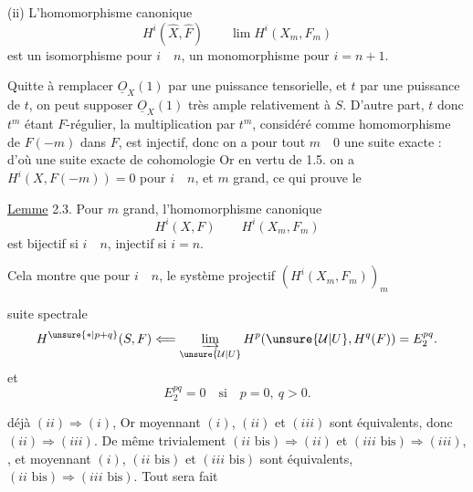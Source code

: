 (ii) L'homomorphisme canonique
\[
H^i(\widehat X,\widehat F)\qquad \lim H^i(X_m,F_m)
\]
est un isomorphisme pour $i\quad n$, un monomorphisme pour $i=n+1$.

 Quitte à remplacer $\underline O_X(1)$ par une puissance tensorielle, et $t$ par une puissance de $t$, on peut supposer $\underline O_X(1)$ très ample relativement à $S$. D'autre part, $t$ donc $t^m$ étant $F$-régulier, la multiplication par $t^m$, considéré comme homomorphisme de $F(-m)$ dans $F$, est injectif, donc on a pour tout $m\quad 0$ une suite exacte :
d'où une suite exacte de cohomologie
Or en vertu de 1.5. on a $H^i(X,F(-m))=0$ pour $i\quad n$, et $m$ grand, ce qui prouve le

\uline{Lemme} 2.3.  Pour $m$ grand, l'homomorphisme canonique
\[
H^i(X,F)\qquad H^i(X_m,F_m)
\]
est bijectif si $i\quad n$, injectif si $i=n$.

Cela montre que pour $i\quad n$, le système projectif $(H^i(X_m,F_m))_m$


 suite spectrale
\[
H^{\unsure{*|p+q}}(S,F)\Longleftarrow\varinjlim_{\unsure{\mathcal U|U}} H^p(\unsure{\mathcal U|U},H^q(F))=E_2^{pq}.
\]
et
\[
E_2^{pq}=0\quad\text{si}\quad p=0,\ q>0.
\]

  déjà $(ii)\Rightarrow(i)$, Or moyennant $(i)$, $(ii)$ et $(iii)$ sont équivalents, donc $(ii)\Rightarrow(iii)$. De même trivialement $(ii\text{ bis})\Rightarrow(ii)$ et $(iii\text{ bis})\Rightarrow(iii)$, , et  moyennant $(i)$, $(ii\text{ bis})$ et $(iii\text{ bis})$ sont équivalents,  $(ii\text{ bis})\Rightarrow(iii\text{ bis})$. Tout sera fait



